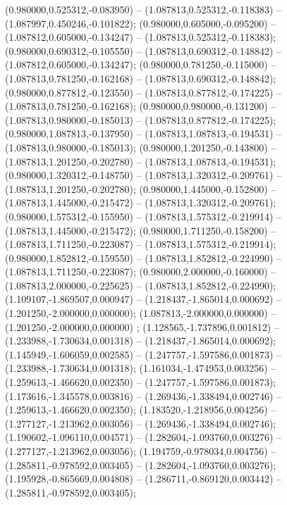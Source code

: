  (0.980000,0.525312,-0.083950) -- (1.087813,0.525312,-0.118383) -- (1.087997,0.450246,-0.101822);
 (0.980000,0.605000,-0.095200) -- (1.087812,0.605000,-0.134247) -- (1.087813,0.525312,-0.118383);
 (0.980000,0.690312,-0.105550) -- (1.087813,0.690312,-0.148842) -- (1.087812,0.605000,-0.134247);
 (0.980000,0.781250,-0.115000) -- (1.087813,0.781250,-0.162168) -- (1.087813,0.690312,-0.148842);
 (0.980000,0.877812,-0.123550) -- (1.087813,0.877812,-0.174225) -- (1.087813,0.781250,-0.162168);
 (0.980000,0.980000,-0.131200) -- (1.087813,0.980000,-0.185013) -- (1.087813,0.877812,-0.174225);
 (0.980000,1.087813,-0.137950) -- (1.087813,1.087813,-0.194531) -- (1.087813,0.980000,-0.185013);
 (0.980000,1.201250,-0.143800) -- (1.087813,1.201250,-0.202780) -- (1.087813,1.087813,-0.194531);
 (0.980000,1.320312,-0.148750) -- (1.087813,1.320312,-0.209761) -- (1.087813,1.201250,-0.202780);
 (0.980000,1.445000,-0.152800) -- (1.087813,1.445000,-0.215472) -- (1.087813,1.320312,-0.209761);
 (0.980000,1.575312,-0.155950) -- (1.087813,1.575312,-0.219914) -- (1.087813,1.445000,-0.215472);
 (0.980000,1.711250,-0.158200) -- (1.087813,1.711250,-0.223087) -- (1.087813,1.575312,-0.219914);
 (0.980000,1.852812,-0.159550) -- (1.087813,1.852812,-0.224990) -- (1.087813,1.711250,-0.223087);
 (0.980000,2.000000,-0.160000) -- (1.087813,2.000000,-0.225625) -- (1.087813,1.852812,-0.224990);
 (1.109107,-1.869507,0.000947) -- (1.218437,-1.865014,0.000692) -- (1.201250,-2.000000,0.000000);
 (1.087813,-2.000000,0.000000) -- (1.201250,-2.000000,0.000000) ;
 (1.128565,-1.737896,0.001812) -- (1.233988,-1.730634,0.001318) -- (1.218437,-1.865014,0.000692);
 (1.145949,-1.606059,0.002585) -- (1.247757,-1.597586,0.001873) -- (1.233988,-1.730634,0.001318);
 (1.161034,-1.474953,0.003256) -- (1.259613,-1.466620,0.002350) -- (1.247757,-1.597586,0.001873);
 (1.173616,-1.345578,0.003816) -- (1.269436,-1.338494,0.002746) -- (1.259613,-1.466620,0.002350);
 (1.183520,-1.218956,0.004256) -- (1.277127,-1.213962,0.003056) -- (1.269436,-1.338494,0.002746);
 (1.190602,-1.096110,0.004571) -- (1.282604,-1.093760,0.003276) -- (1.277127,-1.213962,0.003056);
 (1.194759,-0.978034,0.004756) -- (1.285811,-0.978592,0.003405) -- (1.282604,-1.093760,0.003276);
 (1.195928,-0.865669,0.004808) -- (1.286711,-0.869120,0.003442) -- (1.285811,-0.978592,0.003405);
